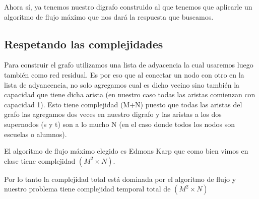 Ahora sí, ya tenemos nuestro digrafo construido al que tenemos que aplicarle un algoritmo de flujo máximo que nos dará la respuesta que buscamos.

\subsection{Respetando las complejidades}

Para construir el grafo utilizamos una lista de adyacencia la cual usaremos luego también como red residual. Es por eso que al conectar un nodo con otro en la lista de adyancencia, no solo agregamos cual es dicho vecino sino también la capacidad que tiene dicha arista (en nuestro caso todas las aristas comienzan con capacidad 1). Esto tiene complejidad \bigo(M+N) puesto que todas las aristas del grafo las agregamos dos veces en nuestro digrafo y las aristas a los dos supernodos (s y t) son a lo mucho N (en el caso donde todos los nodos son escuelas o alumnos). 

El algoritmo de flujo máximo elegido es Edmons Karp que como bien vimos en clase tiene complejidad \bigo$(M^2 \times N)$.

Por lo tanto la complejidad total está dominada por el algoritmo de flujo y nuestro problema tiene complejidad temporal total de \bigo$(M^2 \times N)$
